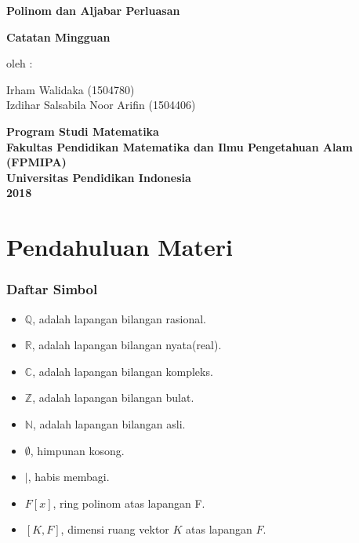 \documentclass[12pt,letterpaper]{book}
\begin{document}
\frontmatter
\begin{titlepage}     
 \begin{center}
      {\Large\textbf{Polinom dan Aljabar Perluasan   }}\\ %
\par    \vspace{1cm}           
 	\textbf{\large Catatan Mingguan}     
 \end{center}        
	\vspace{1cm}      
	\hspace{6,8cm}oleh :
\begin{center}Irham Walidaka (1504780)\\ Izdihar Salsabila Noor Arifin (1504406) \\ \end{center} %
\begin{center}      
	\par \vfill            
	\vspace*{3cm}      {\bf \large Program Studi Matematika}\\ %
	{\bf \large Fakultas Pendidikan Matematika dan Ilmu Pengetahuan Alam (FPMIPA)}\\ %
	{\bf \large Universitas Pendidikan Indonesia}\\ %
	{\bf  \large 2018 } %
 \end{center} 
\end{titlepage}

\tableofcontents
\mainmatter
\part{Pendahuluan Materi}
\section{Daftar Simbol}
	\begin{itemize}
	\item $\mathbb{Q}$, adalah lapangan bilangan rasional.
	\item $\mathbb{R}$, adalah lapangan bilangan nyata(real).
	\item $\mathbb{C}$, adalah lapangan bilangan kompleks.
	\item $\mathbb{Z}$, adalah lapangan bilangan bulat.
	\item $\mathbb{N}$, adalah lapangan bilangan asli.
	\item $\emptyset$, himpunan kosong.
	\item $\mid$, habis membagi.
	\item $F[x]$, ring polinom atas lapangan F.
	\item $[K,F]$, dimensi ruang vektor $K$ atas lapangan $F$.
	\end{itemize}
\end{document}
